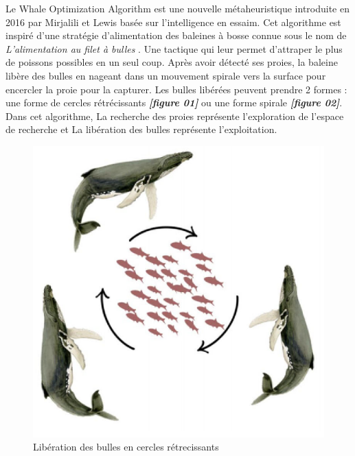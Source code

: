 \documentclass[12pt]{article}
\begin{document}
Le Whale Optimization Algorithm est une nouvelle métaheuristique introduite en 2016 par Mirjalili et Lewis basée sur l’intelligence en essaim. Cet algorithme est inspiré d’une stratégie d’alimentation des baleines à bosse connue sous le nom de \emph{L'alimentation au filet à bulles} . Une tactique qui leur permet d’attraper le plus de poissons possibles en un seul coup. Après avoir détecté ses proies, la baleine libère des bulles en nageant dans un mouvement spirale vers la surface pour encercler la proie pour la capturer.
Les bulles libérées peuvent prendre 2 formes : une forme de cercles rétrécissants \textbf{\emph{[figure 01]}} ou une forme spirale \textbf{\emph{[figure 02]}}. 
Dans cet algorithme, La recherche des proies représente l’exploration de l’espace de recherche et La libération des bulles représente l’exploitation.
\begin{figure}[H] 
    \includegraphics[width=\linewidth]{../figures/cercles.png}
    \caption{Libération des bulles en cercles rétrecissants}
\end{figure}
\end{document}

